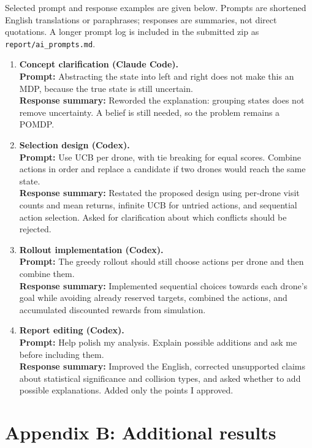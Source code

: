 \documentclass[11pt,a4paper]{article}
\begin{document}
\noindent Selected prompt and response examples are given below. Prompts are shortened English translations or paraphrases; responses are summaries, not direct quotations. A longer prompt log is included in the submitted zip as \texttt{report/ai\_prompts.md}.

\begin{enumerate}[itemsep=0.5em]
  \item \textbf{Concept clarification (Claude Code).}\\
  \textbf{Prompt:} Abstracting the state into left and right does not make this an MDP, because the true state is still uncertain.\\
  \textbf{Response summary:} Reworded the explanation: grouping states does not remove uncertainty. A belief is still needed, so the problem remains a POMDP.

  \item \textbf{Selection design (Codex).}\\
  \textbf{Prompt:} Use UCB per drone, with tie breaking for equal scores. Combine actions in order and replace a candidate if two drones would reach the same state.\\
  \textbf{Response summary:} Restated the proposed design using per-drone visit counts and mean returns, infinite UCB for untried actions, and sequential action selection. Asked for clarification about which conflicts should be rejected.

  \item \textbf{Rollout implementation (Codex).}\\
  \textbf{Prompt:} The greedy rollout should still choose actions per drone and then combine them.\\
  \textbf{Response summary:} Implemented sequential choices towards each drone's goal while avoiding already reserved targets, combined the actions, and accumulated discounted rewards from simulation.

  \item \textbf{Report editing (Codex).}\\
  \textbf{Prompt:} Help polish my analysis. Explain possible additions and ask me before including them.\\
  \textbf{Response summary:} Improved the English, corrected unsupported claims about statistical significance and collision types, and asked whether to add possible explanations. Added only the points I approved.
\end{enumerate}

\section*{Appendix B: Additional results}
\end{document}
